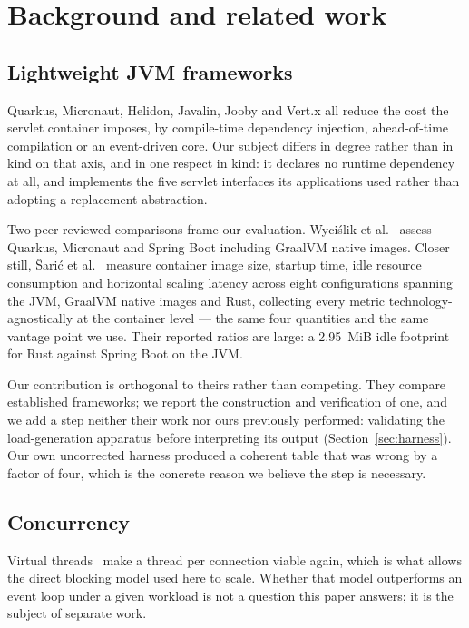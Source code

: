 \documentclass[preprint,12pt]{elsarticle}
\begin{document}
\section{Background and related work}
\label{sec:background}

\subsection{Lightweight JVM frameworks}

Quarkus, Micronaut, Helidon, Javalin, Jooby and Vert.x all reduce the cost the
servlet container imposes, by compile-time dependency injection, ahead-of-time
compilation or an event-driven core. Our subject differs in degree rather than
in kind on that axis, and in one respect in kind: it declares no runtime
dependency at all, and implements the five servlet interfaces its applications
used rather than adopting a replacement abstraction.

Two peer-reviewed comparisons frame our evaluation. Wyci{\'s}lik et
al.~\cite{wycislik2023} assess Quarkus, Micronaut and Spring Boot including
GraalVM native images. Closer still, {\v S}ari{\'c} et al.~\cite{saric2026}
measure container image size, startup time, idle resource consumption and
horizontal scaling latency across eight configurations spanning the JVM, GraalVM
native images and Rust, collecting every metric technology-agnostically at the
container level --- the same four quantities and the same vantage point we use.
Their reported ratios are large: a 2.95~MiB idle footprint for Rust against
Spring Boot on the JVM.

Our contribution is orthogonal to theirs rather than competing. They compare
established frameworks; we report the construction and verification of one, and
we add a step neither their work nor ours previously performed: validating the
load-generation apparatus before interpreting its output
(Section~\ref{sec:harness}). Our own uncorrected harness produced a coherent
table that was wrong by a factor of four, which is the concrete reason we
believe the step is necessary.

\subsection{Concurrency}

Virtual threads~\cite{jep444} make a thread per connection viable again, which
is what allows the direct blocking model used here to scale. Whether that model
outperforms an event loop under a given workload is not a question this paper
answers; it is the subject of separate work.
\end{document}
